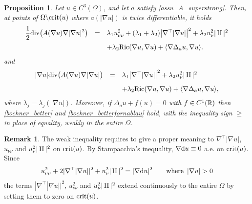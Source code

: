 \documentclass[10 pt,a4paper]{article}
\newtheorem{proposition}[definition]{Proposition}
\theoremstyle{definition}
\newtheorem{remark}[definition]{Remark}
\begin{document}
\begin{proposition}
	Let $u \in C^3(\Omega)$, and let $a$ satisfy \eqref{assu_A_superstrong}. Then, at points of $\Omega \backslash {\rm crit}(u)$ where $a(|\nabla u|)$ is twice differentiable, it holds
	\begin{equation}\label{bochner_better}
		\begin{array}{lcl}
			\displaystyle \frac{1}{2} \mathrm{div}\big( A(\nabla u) \nabla |\nabla u|^2 \big) & = & \lambda_1 u_{\nu\nu}^2 + (\lambda_1+\lambda_2) \big|\nabla^\top  |\nabla u|\big|^2 +\lambda_2u_\nu^2|\operatorname{II}|^2 \\[0.3cm]
			& & \displaystyle + \lambda_2\mathrm{Ric}(\nabla u, \nabla u) + \langle \nabla \Delta_a u, \nabla u \rangle.
		\end{array} 
	\end{equation}
	and 
	\begin{equation}\label{bochner_betterfornablau}
		\begin{array}{lcl}
			\displaystyle |\nabla u| \mathrm{div}\big( A(\nabla u) \nabla |\nabla u| \big) & = & \lambda_1 \big|\nabla^\top  |\nabla u|\big|^2 +\lambda_2u_\nu^2|\operatorname{II}|^2 \\[0.3cm]
			& & \displaystyle + \lambda_2\mathrm{Ric}(\nabla u, \nabla u) + \langle \nabla \Delta_a u, \nabla u \rangle,
		\end{array} 
	\end{equation}
	where $\lambda_j = \lambda_j(|\nabla u|)$. Moreover, if $\Delta_a u + f(u) = 0$ with $f \in C^1(\mathbb R)$ then \eqref{bochner_better} and \eqref{bochner_betterfornablau} hold, with the inequality sign $\geq$ in place of equality, weakly in the entire $\Omega$.
\end{proposition}

\begin{remark}\label{rem_stampa}
	The weak inequality requires to give a proper meaning to $\nabla^\top  |\nabla u|$, $u_{\nu\nu}$ and $u^2_\nu |\operatorname{II}|^2$ on ${\rm crit}(u)$. By Stampacchia's inequality, $\nabla \mathrm{d} u \equiv 0$ a.e. on ${\rm crit}(u)$. Since  
	\[
		u_{\nu\nu}^2 + 2|\nabla^\top |\nabla u||^2 + u_\nu^2|\II|^2 = |\nabla \di u|^2 \qquad \text{where } \, |\nabla u|> 0
	\]
	the terms $|\nabla^\top |\nabla u||^2$, $u_{\nu\nu}^2$ and $u_\nu^2|\operatorname{II}|^2$ extend continuously to the entire $\Omega$ by setting them to zero on ${\rm crit}(u)$.
\end{remark}
\end{document}
